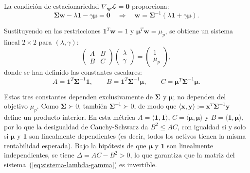 La condición de estacionariedad $\nabla_{\mathbf{w}} \mathcal{L} =
\mathbf{0}$ proporciona:
\begin{equation}
    \boldsymbol{\Sigma} \mathbf{w} - \lambda \mathbf{1}
    - \gamma \boldsymbol{\mu} = \mathbf{0}
    \quad \Longrightarrow \quad
    \mathbf{w} = \boldsymbol{\Sigma}^{-1}
    (\lambda \mathbf{1} + \gamma \boldsymbol{\mu}).
    \label{eq:estacionariedad-analitica}
\end{equation}

Sustituyendo en las restricciones $\mathbf{1}^T \mathbf{w} = 1$ y
$\boldsymbol{\mu}^T \mathbf{w} = \mu_p$, se obtiene un sistema lineal
$2 \times 2$ para $(\lambda, \gamma)$:
\begin{equation}
    \begin{pmatrix}
        A & B \\
        B & C
    \end{pmatrix}
    \begin{pmatrix}
        \lambda \\
        \gamma
    \end{pmatrix}
    = \begin{pmatrix}
        1 \\
        \mu_p
    \end{pmatrix},
    \label{eq:sistema-lambda-gamma}
\end{equation}
donde se han definido las constantes escalares:
\begin{equation}
    A = \mathbf{1}^T \boldsymbol{\Sigma}^{-1} \mathbf{1}, \qquad
    B = \mathbf{1}^T \boldsymbol{\Sigma}^{-1} \boldsymbol{\mu}, \qquad
    C = \boldsymbol{\mu}^T \boldsymbol{\Sigma}^{-1} \boldsymbol{\mu}.
    \label{eq:constantes-abc}
\end{equation}

Estas tres constantes dependen exclusivamente de $\boldsymbol{\Sigma}$
y $\boldsymbol{\mu}$; no dependen del objetivo $\mu_p$. Como
$\boldsymbol{\Sigma} \succ 0$, también $\boldsymbol{\Sigma}^{-1} \succ 0$,
de modo que $\langle \mathbf{x}, \mathbf{y} \rangle :=
\mathbf{x}^T \boldsymbol{\Sigma}^{-1} \mathbf{y}$ define un producto interior.
En esta métrica $A = \langle \mathbf{1}, \mathbf{1} \rangle$,
$C = \langle \boldsymbol{\mu}, \boldsymbol{\mu} \rangle$ y
$B = \langle \mathbf{1}, \boldsymbol{\mu} \rangle$, por lo que la desigualdad
de Cauchy-Schwarz da $B^2 \le AC$, con igualdad si y solo si $\boldsymbol{\mu}$
y $\mathbf{1}$ son linealmente dependientes (es decir, todos los activos tienen
la misma rentabilidad esperada). Bajo la hipótesis de que $\boldsymbol{\mu}$ y
$\mathbf{1}$ son linealmente independientes, se tiene $\Delta = AC - B^2 > 0$,
lo que garantiza que la matriz del sistema~(\ref{eq:sistema-lambda-gamma}) es
invertible.

